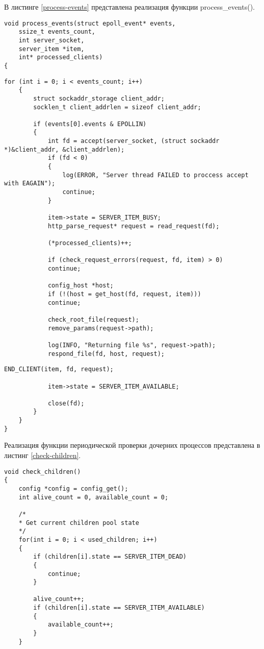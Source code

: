 В листинге \ref{process-events} представлена реализация функции process\_events().

\begin{lstlisting}[caption={Реализация функции process\_client()}, label=process-events]
void process_events(struct epoll_event* events, 
	ssize_t events_count, 
	int server_socket, 
	server_item *item, 
	int* processed_clients)
{
\end{lstlisting}

\begin{lstlisting}[title={Продолжение листинга \ref{process-events}}, label=process-events1, firstnumber=7]
    for (int i = 0; i < events_count; i++) 
	{
		struct sockaddr_storage client_addr;
		socklen_t client_addrlen = sizeof client_addr;
		
		if (events[0].events & EPOLLIN) 
		{
			int fd = accept(server_socket, (struct sockaddr *)&client_addr, &client_addrlen);
			if (fd < 0)
			{
				log(ERROR, "Server thread FAILED to proccess accept with EAGAIN");
				continue;
			}
			
			item->state = SERVER_ITEM_BUSY;
			http_parse_request* request = read_request(fd);
			
			(*processed_clients)++;
			
			if (check_request_errors(request, fd, item) > 0)
			continue;
			
			config_host *host;
			if (!(host = get_host(fd, request, item)))
			continue;
			
			check_root_file(request);
			remove_params(request->path);
			
			log(INFO, "Returning file %s", request->path);
			respond_file(fd, host, request);
\end{lstlisting}

\begin{lstlisting}[title={Окончание листинга \ref{process-events}}, label=process-events2, firstnumber=38]
			END_CLIENT(item, fd, request);
			
			item->state = SERVER_ITEM_AVAILABLE;
			
			close(fd);
		}
	}
}
\end{lstlisting}

Реализация функции периодической проверки дочерних процессов представлена в листинг \ref{check-children}.

\begin{lstlisting}[caption={Реализация функции check\_children()}, label=check-children]
void check_children()
{
	config *config = config_get();
	int alive_count = 0, available_count = 0;
	
	/*
	* Get current children pool state
	*/
	for(int i = 0; i < used_children; i++)
	{
		if (children[i].state == SERVER_ITEM_DEAD)
		{
			continue;
		}
		
		alive_count++;
		if (children[i].state == SERVER_ITEM_AVAILABLE)
		{
			available_count++;
		}
	}
\end{lstlisting}

